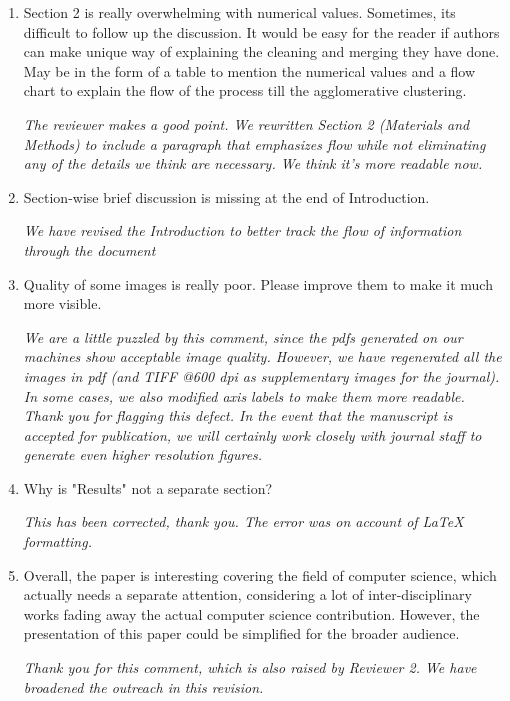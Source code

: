 \documentclass[11pt, oneside]{article}   	%
\begin{document}
\begin{enumerate}
    
\item Section 2 is really overwhelming with numerical values. Sometimes, its difficult to follow up the discussion. It would be easy for the reader if authors can make unique way of explaining the cleaning and merging they have done. May be in the form of a table to mention the numerical values and a flow chart to explain the flow of the process till the agglomerative clustering.  

\emph{The reviewer makes a good point. We rewritten Section 2 (Materials and Methods) to include a paragraph that emphasizes flow while not eliminating any of the details we think are necessary. We think it's more readable now.}

\item Section-wise brief discussion is missing at the end of Introduction.

\emph{We have revised the Introduction to better track the flow of information through the document}

\item Quality of some images is really poor. Please improve them to make it much more visible.

\emph {We are a little puzzled by this comment, since the pdfs generated on our machines show acceptable image quality. However, we have regenerated all the images in pdf (and TIFF @600 dpi as supplementary images for the journal). In some cases, we also modified axis labels to make them more readable. Thank you for flagging this defect. In the event that the manuscript is accepted for publication, we will certainly work closely with journal staff to generate even higher resolution figures.}

\item Why is "Results" not a separate section?

\emph{This has been corrected, thank you. The error was on account of LaTeX formatting.}

\item Overall, the paper is interesting covering the field of computer science, which actually needs a separate attention, considering a lot of inter-disciplinary works fading away the actual computer science contribution. However, the presentation of this paper could be simplified for the broader audience.

\emph{Thank you for this comment, which is also raised by Reviewer 2. We have broadened the outreach in this revision.}
\end{enumerate}
\clearpage
\end{document}

